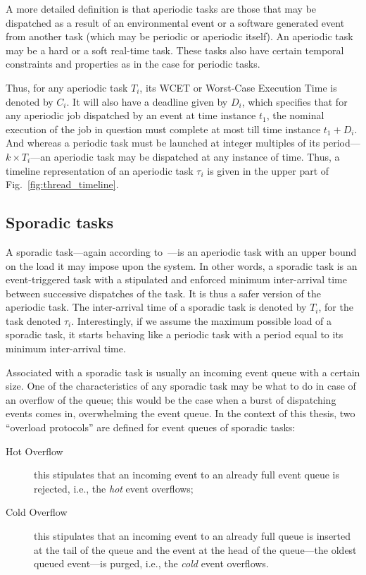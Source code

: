 A more detailed definition is that aperiodic tasks are those that
may be dispatched as a result of an environmental event or a software
generated event from another task (which may be periodic or
aperiodic itself). An aperiodic task may be a hard or a soft
real-time task. These tasks also have certain temporal constraints
and properties as in the case for periodic tasks.

Thus, for any aperiodic task $T_i$, its WCET or Worst-Case Execution
Time is denoted by $C_i$. It will also have a deadline given by $D_i$,
which specifies that for any aperiodic job dispatched by an event at
time instance $t_1$, the nominal execution of the job in question must
complete at most till time instance $t_1 + D_i$. And whereas a
periodic task must be launched at integer multiples of its
period---$k\times T_i$---an aperiodic task may be dispatched at any
instance of time. Thus, a timeline representation of an aperiodic task
$\tau_i$ is given in the upper part of Fig.~\ref{fig:thread_timeline}.

\subsection{Sporadic tasks}
A sporadic task---again according to~\cite{sha@rts04}---is an
aperiodic task with an upper bound on the load it may impose upon the
system. In other words, a sporadic task is an event-triggered task
with a stipulated and enforced minimum inter-arrival time between
successive dispatches of the task. It is thus a safer version of the
aperiodic task. The inter-arrival time of a sporadic task is denoted
by $T_i$, for the task denoted $\tau_i$. Interestingly, if we assume
the maximum possible load of a sporadic task, it starts behaving like
a periodic task with a period equal to its minimum inter-arrival time.

Associated with a sporadic task is usually an incoming event queue
with a certain size. One of the characteristics of any sporadic task
may be what to do in case of an overflow of the queue; this would be
the case when a burst of dispatching events comes in, overwhelming the
event queue. In the context of this thesis, two ``overload protocols''
are defined for event queues of sporadic tasks:

\begin{description}
\item[Hot Overflow]{this stipulates that an incoming event to an
  already full event queue is rejected, i.e., the \emph{hot} event
  overflows;}
\item[Cold Overflow]{this stipulates that an incoming event to an
  already full queue is inserted at the tail of the queue and the
  event at the head of the queue---the oldest queued event---is
  purged, i.e., the \emph{cold} event overflows.}
\end{description}

